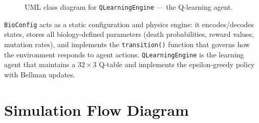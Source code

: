 \documentclass[12pt,a4paper]{article}
\begin{document}
\begin{figure}[H]
\centering
{}
\caption{UML class diagram for \texttt{QLearningEngine} --- the Q-learning agent.}
\label{fig:qlearning_class}
\end{figure}

\texttt{BioConfig} acts as a static configuration and physics engine: it encodes/decodes states, stores all biology-defined parameters (death probabilities, reward values, mutation rates), and implements the \texttt{transition()} function that governs how the environment responds to agent actions. \texttt{QLearningEngine} is the learning agent that maintains a $32 \times 3$ Q-table and implements the epsilon-greedy policy with Bellman updates.

\section{Simulation Flow Diagram}
\end{document}
